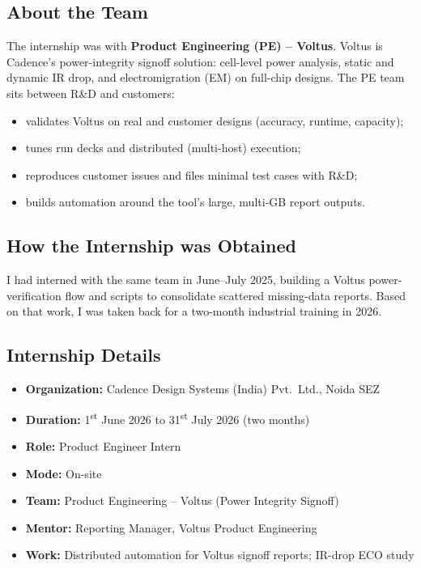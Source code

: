 \documentclass[11pt,a4paper]{article}
\begin{document}
\subsection{About the Team}
The internship was with \textbf{Product Engineering (PE) -- Voltus}. Voltus is Cadence's
power-integrity signoff solution: cell-level power analysis, static and dynamic IR drop,
and electromigration (EM) on full-chip designs. The PE team sits between R\&D and customers:
\begin{itemize}
  \item validates Voltus on real and customer designs (accuracy, runtime, capacity);
  \item tunes run decks and distributed (multi-host) execution;
  \item reproduces customer issues and files minimal test cases with R\&D;
  \item builds automation around the tool's large, multi-GB report outputs.
\end{itemize}

\subsection{How the Internship was Obtained}
I had interned with the same team in June--July 2025, building a Voltus power-verification
flow and scripts to consolidate scattered missing-data reports. Based on that work, I was
taken back for a two-month industrial training in 2026.

\subsection{Internship Details}
\begin{itemize}
  \item \textbf{Organization:} Cadence Design Systems (India) Pvt.\ Ltd., Noida SEZ
  \item \textbf{Duration:} 1\textsuperscript{st} June 2026 to 31\textsuperscript{st} July 2026 (two months)
  \item \textbf{Role:} Product Engineer Intern
  \item \textbf{Mode:} On-site
  \item \textbf{Team:} Product Engineering -- Voltus (Power Integrity Signoff)
  \item \textbf{Mentor:} Reporting Manager, Voltus Product Engineering
  \item \textbf{Work:} Distributed automation for Voltus signoff reports; IR-drop ECO study
\end{itemize}
\end{document}
